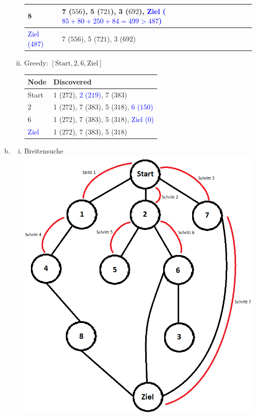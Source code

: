 \documentclass[fleqn]{scrartcl}
\begin{document}
\begin{enumerate}[a)]
\begin{enumerate}[i.]
\begin{tabularx}{\linewidth}{|l|X|}
8&7 ($556$), 5 ($721$), 3 ($692$), \textcolor{blue}{Ziel ($85+80+250+84=499 > 487$)}\\\hline
\textcolor{blue}{Ziel (487)}&7 ($556$), 5 ($721$), 3 ($692$)\\\hline
\end{tabularx}
\item Greedy: $[\text{Start},2,6,\text{Ziel}]$\\
\begin{tabularx}{\linewidth}{|l|X|}
\hline
Node&Discovered\\
\hline\hline
Start&1 ($272$), \textcolor{blue}{2 ($219$)}, 7 ($383$)\\\hline
2&1 ($272$), 7 ($383$), 5 ($318$), \textcolor{blue}{6 ($150$)}\\\hline
6&1 ($272$), 7 ($383$), 5 ($318$), \textcolor{blue}{Ziel (0)}\\\hline
\textcolor{blue}{Ziel}&1 ($272$), 7 ($383$), 5 ($318$)\\\hline
\end{tabularx}
\end{enumerate}
\item
\begin{enumerate}[i.]
\item Breitensuche\\
\includegraphics[width=\linewidth]{pictures/breadth-first-search.png}

\end{enumerate}
\end{enumerate}
\end{document}
